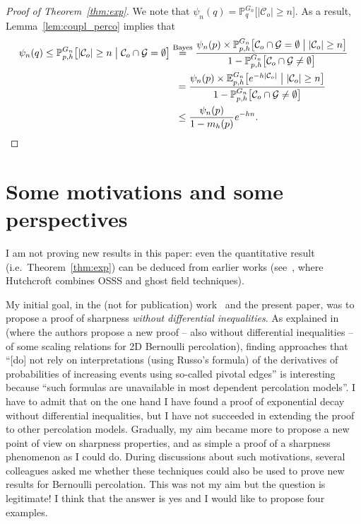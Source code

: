 \documentclass[10pt]{amsart}
\theoremstyle{definition}\newtheorem{defi}[theo]{Definition}\newtheorem{rema}[theo]{Remark}\newtheorem{exam}[theo]{Example}\newtheorem{exem}[theo]{Example}\newtheorem{nota}[theo]{Notation}
\newcommand{\E}{\mathbb{E}}
\newcommand{\Pro}{\mathbb{P}}
\newcommand{\calC}{\mathcal{C}}
\newcommand{\calG}{\mathcal{G}}
\begin{document}
\begin{proof}[Proof of Theorem~\ref{thm:exp}]
We note that $\psi_n(q)=\Pro_q^{G_n} \big[|\calC_o|\ge n \big]$. As a result, Lemma~\ref{lem:coupl_perco} implies that
\begin{align*}
\psi_n(q)\le\Pro_{p,h}^{G_n} \big[|\calC_o|\ge n \; \big| \; \calC_o \cap \calG = \emptyset
\big] &\overset{\text{Bayes}}{=} \frac{\psi_n(p) \times \Pro_{p,h}^{G_n}\big[\calC_o \cap \calG = \emptyset \; \big| \; |\calC_o| \ge n \big]}{1-\Pro_{p,h}^{G_n}\big[\calC_o \cap \calG \neq \emptyset \big]}\\
& \hspace{0.2cm}= \frac{\psi_n(p) \times \E_{p,h}^{G_n}\big[e^{-h|\calC_o|} \; \big| \; |\calC_o| \ge n \big]}{1-\Pro_{p,h}^{G_n}\big[\calC_o \cap \calG \neq \emptyset \big]}\\
& \hspace{0.2cm}\le \frac{\psi_n(p)}{1-m_h(p)} e^{-hn}. \qedhere
\end{align*}
\end{proof}

\section{Some motivations and some perspectives}\label{sec:motiv}

I am not proving new results in this paper: even the quantitative result (i.e.\ Theorem~\ref{thm:exp}) can be deduced from earlier works (see~\cite{Hut20}, where Hutchcroft combines OSSS and ghost field techniques).

My initial goal, in the (not for publication) work~\cite{Van22} and the present paper, was to propose a proof of sharpness \emph{without differential inequalities}. As explained in~\cite{DMT21'} (where the authors propose a new proof -- also without differential inequalities -- of some scaling relations for 2D Bernoulli percolation), finding approaches that ``[do] not rely on interpretations (using Russo’s formula) of the derivatives of probabilities of increasing events using so-called pivotal edges'' is interesting because ``such formulas are unavailable in most dependent percolation models''. I have to admit that on the one hand I have found a proof of exponential decay without differential inequalities, but I have not succeeded in extending the proof to other percolation models. Gradually, my aim became more to propose a new point of view on sharpness properties, and as simple a proof of a sharpness phenomenon as I could do. During discussions about such motivations, several colleagues asked me whether these techniques could also be used to prove new results for Bernoulli percolation. This was not my aim but the question is legitimate! I think that the answer is yes and I would like to propose four examples.
\end{document}
